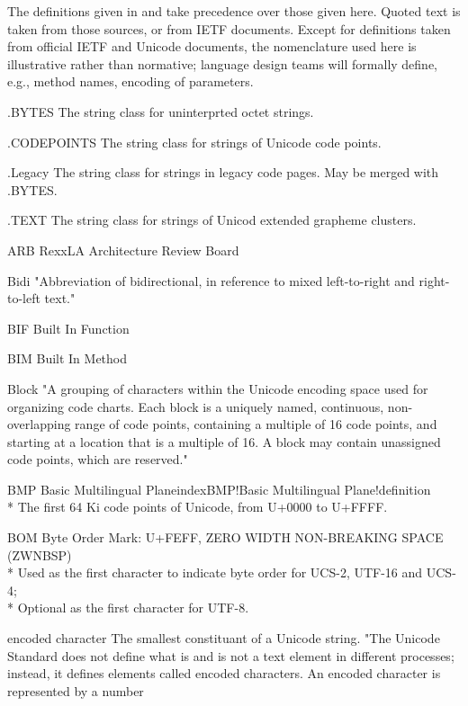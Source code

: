 \documentclass[b4paper]{article}
\begin{document}
The definitions given in \cite{USTD:Gloss} and \cite{Unicode} take
precedence over those given here. Quoted text is taken from those sources, or from IETF documents.
Except for definitions taken from official IETF and Unicode documents,
the nomenclature used here is illustrative rather than normative;
language design teams will formally define, e.g., method names, encoding of parameters.

\begin{definition}
\item [.BYTES] The string class for uninterprted octet strings.
\item [.CODEPOINTS] The string class for strings of Unicode code points.
\item [.Legacy] The string class for strings in legacy code pages.
May be merged with .BYTES.
\item [.TEXT] The string class for strings of Unicod extended grapheme clusters.
\item[ARB] RexxLA Architecture Review Board
\item [Bidi] "Abbreviation of bidirectional, in reference to mixed left-to-right and right-to-left text."
\item [BIF] Built In Function
\item [BIM] Built In Method
\item [Block] "A grouping of characters within the Unicode encoding
space used for organizing code charts. Each block is a uniquely named,
continuous, non-overlapping range of code points, containing a
multiple of 16 code points, and starting at a location that is a
multiple of 16. A block may contain unassigned code points, which are
reserved."
\item [BMP] Basic Multilingual Planeindex{BMP!Basic Multilingual Plane!definition}
\\*
The first 64 Ki code points of Unicode, from U+0000 to U+FFFF.
\item [BOM] Byte Order Mark: U+FEFF, ZERO WIDTH NON-BREAKING SPACE (ZWNBSP)
\\*
Used as the first character to indicate byte order for UCS-2, UTF-16 and UCS-4;
\\*
Optional as the first character for UTF-8.
\item [encoded character] The smallest constituant of a Unicode string.
"The Unicode Standard does not define what is and is not a text
element in different processes; instead, it defines elements called
encoded characters. An encoded character is represented by a number

\end{definition}
\end{document}
